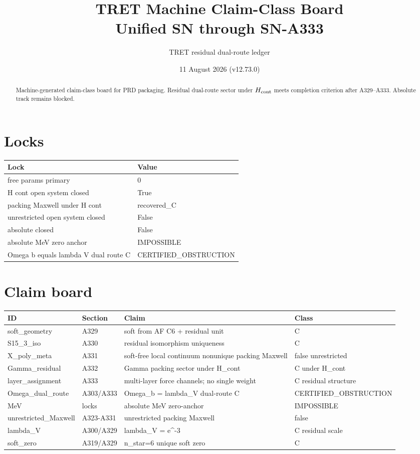 \documentclass[11pt,a4paper]{article}
\title{TRET Machine Claim-Class Board\\Unified SN through SN-A333}
\author{TRET residual dual-route ledger}
\date{11 August 2026 (v12.73.0)}
\begin{document}
\maketitle
\begin{abstract}
Machine-generated claim-class board for PRD packaging. Residual dual-route sector under $H_{\rm cont}$ meets completion criterion after A329--A333. Absolute track remains blocked.
\end{abstract}
\section{Locks}
\begin{center}
\begin{tabular}{@{}ll@{}}
\toprule
Lock & Value \\
\midrule

free params primary & 0 \\
H cont open system closed & True \\
packing Maxwell under H cont & recovered_C \\
unrestricted open system closed & False \\
absolute closed & False \\
absolute MeV zero anchor & IMPOSSIBLE \\
Omega b equals lambda V dual route C & CERTIFIED_OBSTRUCTION \\
\bottomrule
\end{tabular}
\end{center}
\section{Claim board}
\begin{center}
\begin{tabular}{@{}p{3.2cm}p{2.2cm}p{5.5cm}p{2.8cm}@{}}
\toprule
ID & Section & Claim & Class \\
\midrule

soft_geometry & A329 & soft from AF C6 + residual unit & C \\
S15_3_iso & A330 & residual isomorphism uniqueness & C \\
X_poly_meta & A331 & soft-free local continuum nonunique packing Maxwell & false unrestricted \\
Gamma_residual & A332 & Gamma packing sector under H_cont & C under H_cont \\
layer_assignment & A333 & multi-layer force channels; no single weight & C residual structure \\
Omega_dual_route & A303/A333 & Omega_b = lambda_V dual-route C & CERTIFIED_OBSTRUCTION \\
MeV & locks & absolute MeV zero-anchor & IMPOSSIBLE \\
unrestricted_Maxwell & A323-A331 & unrestricted packing Maxwell & false \\
lambda_V & A300/A329 & lambda_V = e^{-3} & C residual scale \\
soft_zero & A319/A329 & n_star=6 unique soft zero & C \\
\bottomrule
\end{tabular}
\end{center}
\end{document}
